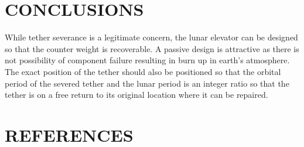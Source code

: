\documentclass[twocolumn,prl,nobalancelastpage,aps,10pt]{revtex4-1}
\begin{document}
\section{CONCLUSIONS}

While tether severance is a legitimate concern, the lunar elevator can be designed so that the counter weight is recoverable. A passive design is attractive as there is not possibility of component failure resulting in burn up in earth's atmosphere. The exact position of the tether should also be positioned so that the orbital period of the severed tether and the lunar period is an integer ratio so that the tether is on a free return to its original location where it can be repaired.

\section{REFERENCES}


\end{document}
